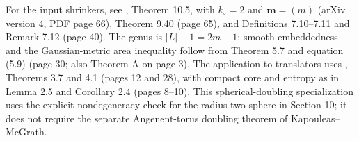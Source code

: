 \begin{example}
\begin{itemize}
\end{itemize}
For the input shrinkers, see \cite{CatKapouleasMcGrath2023}, Theorem 10.5, with $k_\circ=2$ and $\mathbf m=(m)$ (arXiv version 4, PDF page 66), Theorem 9.40 (page 65), and Definitions 7.10--7.11 and Remark 7.12 (page 40). The genus is $|L|-1=2m-1$; smooth embeddedness and the Gaussian-metric area inequality follow from Theorem 5.7 and equation (5.9) (page 30; also Theorem A on page 3). The application to translators uses \cite{CatSunWang2025}, Theorems 3.7 and 4.1 (pages 12 and 28), with compact core and entropy as in Lemma 2.5 and Corollary 2.4 (pages 8--10). This spherical-doubling specialization uses the explicit nondegeneracy check for the radius-two sphere in Section 10; it does not require the separate Angenent-torus doubling theorem of Kapouleas--McGrath.
\end{example}

